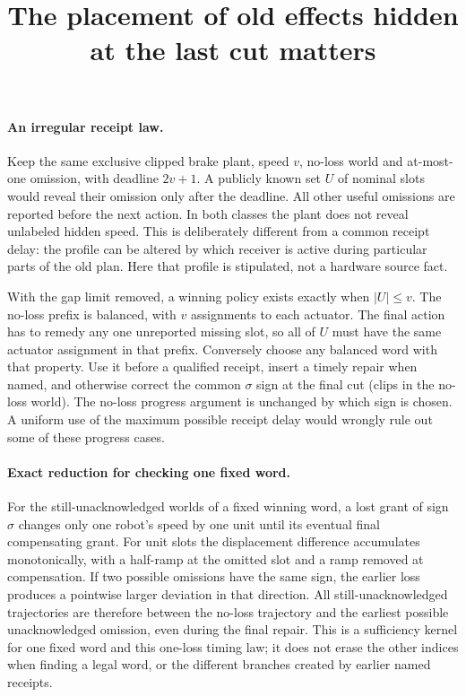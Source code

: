 \documentclass{article}
\begin{document}
\title{The placement of old effects hidden at the last cut matters}
\maketitle

\paragraph{An irregular receipt law.}
Keep the same exclusive clipped brake plant, speed
\(v\), no-loss world and at-most-one omission, with
deadline \(2v+1\). A publicly known set \(U\)
of nominal slots would reveal their omission only
after the deadline. All other useful omissions are
reported before the next action. In both classes
the plant does not reveal unlabeled hidden speed.
This is deliberately different from a common
receipt delay: the profile can be altered by which
receiver is active during particular parts of the old
plan. Here that profile is stipulated, not a
hardware source fact.

With the gap limit removed, a winning policy exists
exactly when \(|U|\le v\). The no-loss prefix is balanced,
with \(v\) assignments to each actuator. The final action
has to remedy any one unreported missing slot, so all
of \(U\) must have the same actuator assignment in that
prefix. Conversely choose any balanced word with that
property. Use it before a qualified receipt, insert
a timely repair when named, and otherwise correct the
common \(\sigma\) sign at the final cut (clips in the
no-loss world). The no-loss progress argument is
unchanged by which sign is chosen. A uniform use of the
maximum possible receipt delay would wrongly rule out
some of these progress cases.

\paragraph{Exact reduction for checking one fixed word.}
For the still-unacknowledged worlds of a fixed winning word,
a lost grant of sign \(\sigma\) changes only one robot's
speed by one unit until its eventual final compensating
grant. For unit slots the displacement difference accumulates
monotonically, with a half-ramp at the omitted slot and
a ramp removed at compensation. If two possible omissions
have the same sign, the earlier loss produces a pointwise
larger deviation in that direction. All still-unacknowledged
trajectories are therefore between the no-loss trajectory
and the earliest possible unacknowledged omission, even
during the final repair. This is a sufficiency kernel for
one fixed word and this one-loss timing law; it does not
erase the other indices when finding a legal word, or the
different branches created by earlier named receipts.
\end{document}
